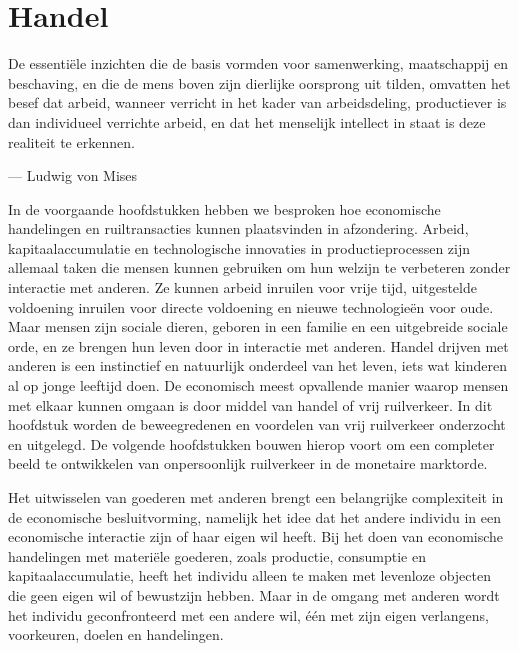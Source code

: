 \hypertarget{handel}{%
\chapter{Handel}\label{handel}}

\begin{blockquotebox}
    De essentiële inzichten die de basis vormden voor samenwerking, maatschappij en beschaving, en die de mens boven zijn dierlijke oorsprong uit tilden, omvatten het besef dat arbeid, wanneer verricht in het kader van arbeidsdeling, productiever is dan individueel verrichte arbeid, en dat het menselijk intellect in staat is deze realiteit te erkennen.\footnotemark
    \par\raggedleft--- Ludwig von Mises
\end{blockquotebox}
\autocite{105}

In de voorgaande hoofdstukken hebben we besproken hoe economische handelingen en ruiltransacties kunnen plaatsvinden in afzondering. Arbeid, kapitaalaccumulatie en technologische innovaties in productieprocessen zijn allemaal taken die mensen kunnen gebruiken om hun welzijn te verbeteren zonder interactie met anderen. Ze kunnen arbeid inruilen voor vrije tijd, uitgestelde voldoening inruilen voor directe voldoening en nieuwe technologieën voor oude. Maar mensen zijn sociale dieren, geboren in een familie en een uitgebreide sociale orde, en ze brengen hun leven door in interactie met anderen. Handel drijven met anderen is een instinctief en natuurlijk onderdeel van het leven, iets wat kinderen al op jonge leeftijd doen. De economisch meest opvallende manier waarop mensen met elkaar kunnen omgaan is door middel van handel of vrij ruilverkeer. In dit hoofdstuk worden de beweegredenen en voordelen van vrij ruilverkeer onderzocht en uitgelegd. De volgende hoofdstukken bouwen hierop voort om een completer beeld te ontwikkelen van onpersoonlijk ruilverkeer in de monetaire marktorde.

Het uitwisselen van goederen met anderen brengt een belangrijke complexiteit in de economische besluitvorming, namelijk het idee dat het andere individu in een economische interactie zijn of haar eigen wil heeft. Bij het doen van economische handelingen met materiële goederen, zoals productie, consumptie en kapitaalaccumulatie, heeft het individu alleen te maken met levenloze objecten die geen eigen wil of bewustzijn hebben. Maar in de omgang met anderen wordt het individu geconfronteerd met een andere wil, één met zijn eigen verlangens, voorkeuren, doelen en handelingen.

